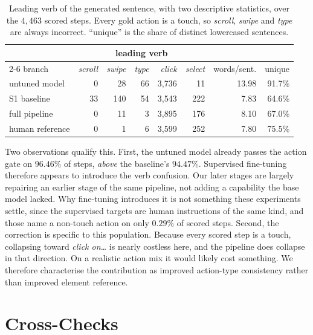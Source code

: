\documentclass[runningheads,a4paper]{llncs}
\begin{document}
\begin{table}[t]
\centering
\caption{Leading verb of the generated sentence, with two descriptive statistics, over the
$4{,}463$ scored steps. Every gold action is a touch, so \emph{scroll}, \emph{swipe} and
\emph{type} are always incorrect. ``unique'' is the share of distinct lowercased sentences.}
\label{tab:verbs}
\small
\begin{tabular}{lrrrrrrr}
\toprule
& \multicolumn{5}{c}{leading verb} & &\\
\cmidrule(lr){2-6}
branch & \emph{scroll} & \emph{swipe} & \emph{type} & \emph{click} & \emph{select}
& words/sent. & unique\\
\midrule
untuned model     & \phantom{0}0 & \phantom{0}28 & 66 & 3{,}736 & \phantom{0}11 & 13.98 &
91.7\%\\
S1 baseline       & 33 & 140 & 54 & 3{,}543 & 222 & \phantom{0}7.83 & 64.6\%\\
full pipeline     & \phantom{0}0 & \phantom{0}11 & \phantom{0}3 & 3{,}895 & 176 &
\phantom{0}8.10 & 67.0\%\\
human reference   & \phantom{0}0 & \phantom{00}1 & \phantom{0}6 & 3{,}599 & 252 &
\phantom{0}7.80 & 75.5\%\\
\bottomrule
\end{tabular}
\end{table}

Two observations qualify this. First, the untuned model already passes the action gate on
$96.46\%$ of steps, \emph{above} the baseline's $94.47\%$. Supervised fine-tuning therefore
appears to introduce the verb confusion. Our later stages are largely repairing an earlier stage
of the same pipeline, not adding a capability the base model lacked. Why fine-tuning introduces it is
not something these experiments settle, since the supervised targets are human instructions of the
same kind, and those name a non-touch action on only $0.29\%$ of scored steps. Second, the
correction is
specific to this population. Because every scored step is a touch, collapsing toward \emph{click
on\ldots} is nearly costless here, and the pipeline does collapse in that direction. On a
realistic action mix it would likely cost something. We therefore characterise the contribution as improved
action-type consistency rather than improved element reference.

\section{Cross-Checks}
\label{sec:cross}
\end{document}
